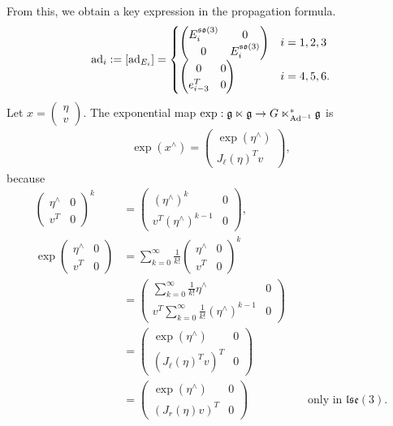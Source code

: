 \documentclass[12pt,class=article,crop=false]{standalone}
\begin{document}
From this, we obtain a key expression in the propagation formula.
\begin{align*}
	\operatorname{ad}_{ i} :=[ \operatorname{ad}_{ E_i}] = \begin{cases}
		\begin{pmatrix} E_i^{ \mathfrak{so}(3) } & 0\\ 0 & E_i^{ \mathfrak{so}(3) }  \end{pmatrix} & i = 1,2,3\\
		\begin{pmatrix} 0&0\\ e_{i-3}^{T} &0 \end{pmatrix} & i = 4,5,6 .
	\end{cases}
\end{align*}
Let $ x = \begin{pmatrix} \eta\\v \end{pmatrix} $. The exponential map $ \exp: \mathfrak{g} \ltimes \mathfrak{g} \to G \ltimes_{\operatorname{Ad}^{-1}}^* \mathfrak{g}  $  is
\begin{align*}
	\exp( x^\wedge ) = \begin{pmatrix} \exp( \eta^\wedge )\\  J_\ell(\eta)^{T} v \end{pmatrix} ,
\end{align*}
because
\begin{align*}
	\begin{pmatrix} \eta^\wedge &0\\ v^{T} & 0 \end{pmatrix}^{k} &= \begin{pmatrix} (\eta^\wedge)^{k} &0\\ v^{T} (\eta^\wedge )^{k-1} &0 \end{pmatrix} ,\\
	\exp \begin{pmatrix} \eta^\wedge &0 \\ v^{T} &0 \end{pmatrix} &= \sum_{ k= 0}^{\infty} \frac{1}{k!} \begin{pmatrix} \eta^\wedge &0\\ v^{T} & 0 \end{pmatrix}^{k} \\
					 &=  \begin{pmatrix} \sum_{ k= 0}^{\infty} \frac{1}{k!}  \eta^\wedge &0\\ v^{T} \sum_{ k= 0}^{\infty}\frac{1}{k!} (\eta^\wedge )^{k-1} & 0 \end{pmatrix} \\
					 &= \begin{pmatrix} \exp( \eta^\wedge ) &0\\ \left(  J_{\ell}( \eta)^{T} v  \right)^{T} & 0  \end{pmatrix}  \\
					 &= \begin{pmatrix} \exp( \eta^\wedge ) &0 \\ \left( J_r(\eta) v \right)^{T} &0  \end{pmatrix} && \text{ only in } \mathfrak{lse}(3) .
\end{align*}
\end{document}
